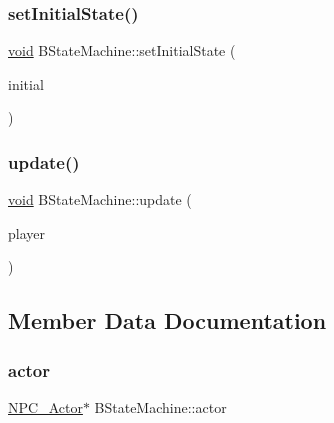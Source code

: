 \mbox{\label{classBStateMachine_aa0b42b7bdb0ab0d870d90e806b3d64e6}} 
\subsubsection{\texorpdfstring{set\+Initial\+State()}{setInitialState()}}
{\footnotesize\ttfamily \hyperlink{imgui__impl__opengl3__loader_8h_ac668e7cffd9e2e9cfee428b9b2f34fa7}{void} B\+State\+Machine\+::set\+Initial\+State (\begin{DoxyParamCaption}\item[{\hyperlink{classBState}{B\+State} $\ast$}]{initial }\end{DoxyParamCaption})}

\mbox{\label{classBStateMachine_a1cee2bb706e0436296b672c33f54fc87}} 
\subsubsection{\texorpdfstring{update()}{update()}}
{\footnotesize\ttfamily \hyperlink{imgui__impl__opengl3__loader_8h_ac668e7cffd9e2e9cfee428b9b2f34fa7}{void} B\+State\+Machine\+::update (\begin{DoxyParamCaption}\item[{\hyperlink{classPlayer__Actor}{Player\+\_\+\+Actor} $\ast$}]{player }\end{DoxyParamCaption})}



\subsection{Member Data Documentation}
\mbox{\label{classBStateMachine_aee8abc0940bb36b601f0a1e43d6ada88}} 
\subsubsection{\texorpdfstring{actor}{actor}}
{\footnotesize\ttfamily \hyperlink{classNPC__Actor}{N\+P\+C\+\_\+\+Actor}$\ast$ B\+State\+Machine\+::actor\hspace{0.3cm}{\ttfamily [private]}}

